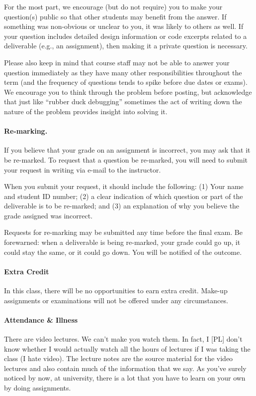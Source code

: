 \documentclass[letterpaper,10pt]{article}
\begin{document}
For the most part, we encourage (but do not require) you to make your question(s) public so that other students may benefit from the answer. If something was non-obvious or unclear to you, it was likely to others as well. If your question includes detailed design information or code excerpts related to a deliverable (e.g., an assignment), then making it a private question is necessary.

Please also keep in mind that course staff may not be able to answer your question immediately as they have many other responsibilities throughout the term (and the frequency of questions tends to spike before due dates or exams). We encourage you to think through the problem before posting, but acknowledge that just like ``rubber duck debugging'' sometimes the act of writing down the nature of the problem provides insight into solving it.

\paragraph{Re-marking.}
If you believe that your grade on an assignment is incorrect, you may ask that it be re-marked. To request that a question be re-marked, you will need to submit your request in writing via e-mail to the instructor.

When you submit your request, it should include the following: (1) Your name and student ID number; (2) a clear indication of which question or part of the deliverable is to be re-marked; and (3) an explanation of why you believe the grade assigned was incorrect.

Requests for re-marking may be submitted any time before the final exam. Be forewarned: when a deliverable is being re-marked, your grade could go up, it could stay the same, or it could go down. You will be notified of the outcome.

\paragraph{Extra Credit}
In this class, there will be no opportunities to earn extra credit. Make-up assignments or examinations will not be offered under any circumstances.

\paragraph{Attendance \& Illness}

There are video lectures. We can't make you watch them. In fact, I [PL] don't know whether I would actually watch all the hours of lectures if I was taking the class (I hate video). The lecture notes are the source material for the video lectures and also contain much of the information that we say. As you've surely noticed by now, at university, there is a lot that you have to learn on your own by doing assignments.
\end{document}
